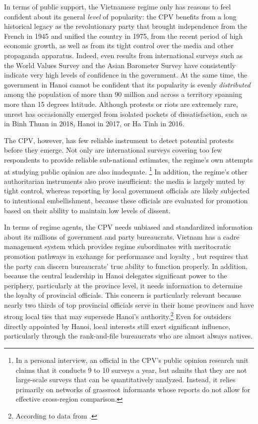 \documentclass[12pt]{article}
\newcommand\fnote[1]{\footnote{\baselineskip=2\normalbaselineskip#1}}
\newcommand{\1}{\mathbbm{1}}
\begin{document}
In terms of public support, the Vietnamese regime only has reasons to feel confident about its general \textit{level} of popularity: the CPV benefits from a long historical legacy as the revolutionary party that brought independence from the French in 1945 and unified the country in 1975, from the recent period of high economic growth, as well as from its tight control over the media and other propaganda apparatus. Indeed, even results from international surveys such as the World Values Survey \citeyearpar{wvs} and the Asian Barometer Survey have consistently indicate very high levels of confidence in the government. At the same time, the government in Hanoi cannot be confident that its popularity is evenly \textit{distributed} among the population of more than 90 million and across a territory spanning more than 15 degrees latitude. Although protests or riots are extremely rare, unrest has occasionally emerged from isolated pockets of dissatisfaction, such as in Binh Thuan in 2018, Hanoi in 2017, or Ha Tinh in 2016. 

The CPV, however, has few reliable instrument to detect potential protests before they emerge. Not only are international surveys covering too few respondents to provide reliable sub-national estimates, the regime's own attempts at studying public opinion are also inadequate. \fnote{In a personal interview, an official in the CPV's public opinion research unit claims that it conducts 9 to 10 surveys a year, but admits that they are not large-scale surveys that can be quantitatively analyzed. Instead, it relies primarily on networks of grassroot informants whose reports do not allow for effective cross-region comparison.} %
In addition, the regime's other authoritarian instruments also prove insufficient: the media is largely muted by tight control, whereas reporting by local government officials are likely subjected to intentional embellishment, because these officials are evaluated for promotion based on their ability to maintain low levels of dissent.

In terms of regime agents, the CPV needs unbiased and standardized information about its millions of government and party bureaucrats. Vietnam has a cadre management system which provides regime subordinates with meritocratic promotion pathways in exchange for performance and loyalty \citep{Svolik2012}, but requires that the party can discern bureaucrats' true ability to function properly. In addition, because the central leadership in Hanoi delegates significant power to the periphery, particularly at the province level, it needs information to determine the loyalty of provincial officials. This concern is particularly relevant because nearly two thirds of top provincial officials serve in their home provinces and have strong local ties that may supersede Hanoi's authority.\fnote{According to data from \citet{MaleskyPhan2017}.} Even for outsiders directly appointed by Hanoi, local interests still exert significant influence, particularly through the rank-and-file bureaucrats who are almost always natives. 
\end{document}
